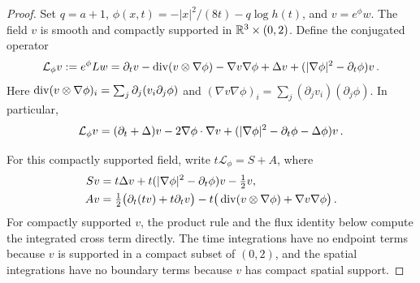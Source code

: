 \documentclass[11pt,letterpaper]{article}
\numberwithin{equation}{section}
\theoremstyle{plain}
\theoremstyle{definition}
\theoremstyle{remark}
\begin{document}
\begin{proof}
Set $q=a+1$, $\phi(x,t)=-|x|^2/(8t)-q\log h(t)$, and $v=e^\phi w$. The field $v$ is smooth and compactly supported in $\mathbb{R}^3\times(0,2)$. Define the conjugated operator
\[
 \mathcal L_\phi v:=e^\phi Lw
 =\partial_t v-\operatorname{div}(v\otimes\nabla\phi)-\nabla v\nabla\phi+\Delta v
   +( |\nabla\phi|^2-\partial_t\phi)v\,.
\]
Here $\operatorname{div}(v\otimes\nabla\phi)_i=\sum_j\partial_j(v_i\partial_j\phi)$ and $(\nabla v\nabla\phi)_i=\sum_j(\partial_jv_i)(\partial_j\phi)$. In particular,
\[
 \mathcal L_\phi v=(\partial_t+\Delta)v-2\nabla\phi\cdot\nabla v
                    +( |\nabla\phi|^2-\partial_t\phi-\Delta\phi)v\,.
\]

For this compactly supported field, write $t\mathcal L_\phi=S+A$, where
\begin{align}
 Sv&=t\Delta v+t( |\nabla\phi|^2-\partial_t\phi)v-\tfrac12v,\label{eq:carleman-S}\\
 Av&=\tfrac12\big(\partial_t(tv)+t\partial_t v\big)
       -t\big(\operatorname{div}(v\otimes\nabla\phi)+\nabla v\nabla\phi\big)\,.\label{eq:carleman-A}
\end{align}
For compactly supported $v$, the product rule and the flux identity below compute the integrated cross term directly. The time integrations have no endpoint terms because $v$ is supported in a compact subset of $(0,2)$, and the spatial integrations have no boundary terms because $v$ has compact spatial support.


\end{proof}
\end{document}
